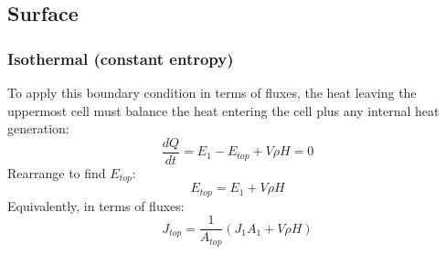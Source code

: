 \subsection{Surface}
\subsubsection{Isothermal (constant entropy)}
To apply this boundary condition in terms of fluxes, the heat leaving the uppermost cell must balance the heat entering the cell plus any internal heat generation:
\begin{equation}
\frac{dQ}{dt} = E_{1} - E_{top} + V \rho H = 0
\end{equation}
Rearrange to find $E_{top}$:
\begin{equation}
E_{top} = E_1 + V \rho H
\end{equation}
Equivalently, in terms of fluxes:
\begin{equation}
J_{top} = \frac{1}{A_{top}} \left( J_1A_1 + V \rho H \right)
\end{equation}
